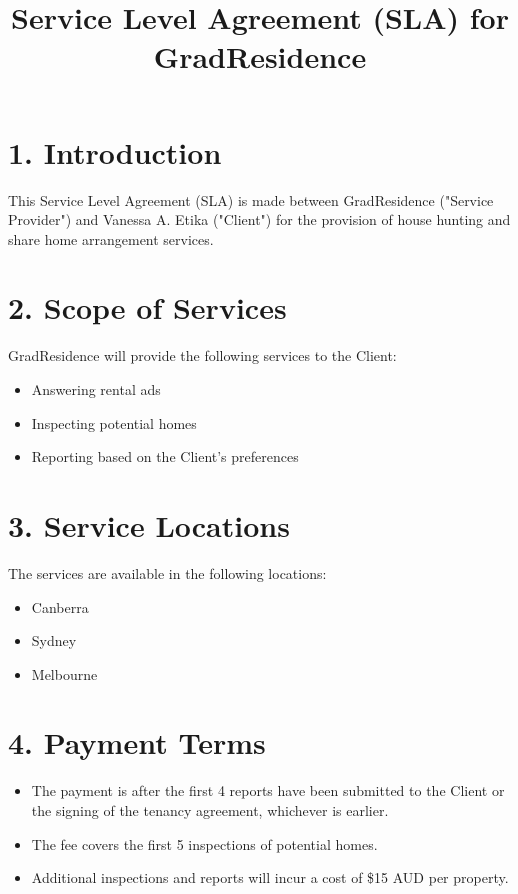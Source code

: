 \documentclass[a4paper,12pt]{article}
\title{Service Level Agreement (SLA) for GradResidence}
\date{}
\begin{document}
\maketitle

\section*{1. Introduction}
This Service Level Agreement (SLA) is made between GradResidence ("Service Provider") and Vanessa A. Etika ("Client") for the provision of house hunting and share home arrangement services.

\section*{2. Scope of Services}
GradResidence will provide the following services to the Client:
\begin{itemize}
    \item Answering rental ads
    \item Inspecting potential homes
    \item Reporting based on the Client's preferences
\end{itemize}

\section*{3. Service Locations}
The services are available in the following locations:
\begin{itemize}
    \item Canberra
    \item Sydney
    \item Melbourne
\end{itemize}

\section*{4. Payment Terms}
\begin{itemize}
    \item The payment is after the first 4 reports have been submitted to the Client or the signing of the tenancy agreement, whichever is earlier.
    \item The fee covers the first 5 inspections of potential homes.
    \item Additional inspections and reports will incur a cost of \$15 AUD per property.
\end{itemize}
\end{document}
